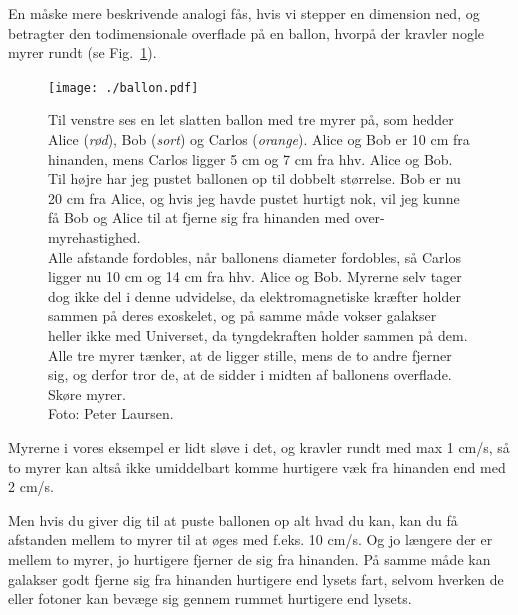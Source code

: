 \documentclass[useAMS,danish]{aa}
\begin{document}
En måske mere beskrivende analogi fås, hvis vi stepper en dimension ned, og betragter den todimensionale overflade på en ballon, hvorpå der kravler nogle myrer rundt (se Fig.~\ref{fig:ballon}).
\begin{figure}[!t]
    \centering
    \texttt{[image: ./ballon.pdf]}
    \caption{\small{
        Til venstre ses en let slatten ballon med tre myrer på, som hedder Alice (\emph{rød}), Bob (\emph{sort}) og Carlos (\emph{orange}).
        Alice og Bob er 10 cm fra hinanden, mens Carlos ligger 5 cm og 7 cm fra hhv. Alice og Bob.
        Til højre har jeg pustet ballonen op til dobbelt størrelse.
        Bob er nu 20 cm fra Alice, og hvis jeg havde pustet hurtigt nok, vil jeg kunne få Bob og Alice til at fjerne sig fra hinanden med over-myrehastighed.\\
        Alle afstande fordobles, når ballonens diameter fordobles, så Carlos ligger nu 10 cm og 14 cm fra hhv. Alice og Bob.
        Myrerne selv tager dog ikke del i denne udvidelse, da elektromagnetiske kræfter holder sammen på deres exoskelet, og på samme måde vokser galakser heller ikke med Universet, da tyngdekraften holder sammen på dem.
        Alle tre myrer tænker, at de ligger stille, mens de to andre fjerner sig, og derfor tror de, at de sidder i midten af ballonens overflade.
        Skøre myrer.\\
        Foto: Peter Laursen.}
    }
    \label{fig:ballon}
\end{figure}
Myrerne i vores eksempel er lidt sløve i det, og kravler rundt med max 1 cm/s, så to myrer kan altså ikke umiddelbart komme hurtigere væk fra hinanden end med 2 cm/s.
%
\begin{figure}
    \caption*{{\sf {}}}
\end{figure}
%
Men hvis du giver dig til at puste ballonen op alt hvad du kan, kan du få afstanden mellem to myrer til at øges med f.eks. 10 cm/s.
Og jo længere der er mellem to myrer, jo hurtigere fjerner de sig fra hinanden.
På samme måde kan galakser godt fjerne sig fra hinanden hurtigere end lysets fart, selvom hverken de eller fotoner kan bevæge sig gennem rummet hurtigere end lysets.
\end{document}
